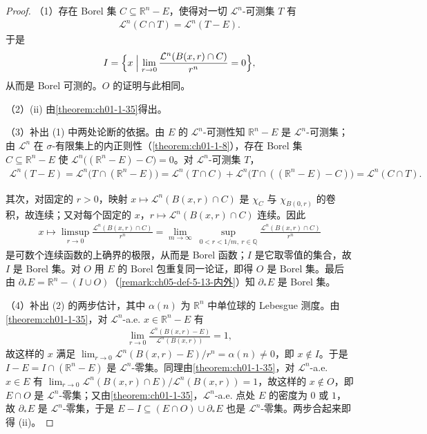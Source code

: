 \documentclass[../../main.tex]{subfiles}%
\begin{document}
\begin{proof}
（1）存在 Borel 集 $C\subseteq\mathbb{R}^n-E$，使得对一切 $\mathcal{L}^n$-可测集 $T$ 有
\begin{align*}
\mathcal{L}^n(C\cap T)=\mathcal{L}^n(T-E).
\end{align*}
于是
\begin{align*}
I=\Bigl\{x\Bigm|\lim_{r\to0}\frac{\mathcal{L}^n(B(x,r)\cap C)}{r^n}=0\Bigr\},
\end{align*}
从而是 Borel 可测的。$O$ 的证明与此相同。

（2）(ii) 由\cref{theorem:ch01-1-35}得出。%

（3）补出 (1) 中两处论断的依据。由 $E$ 的 $\mathcal{L}^n$-可测性知 $\mathbb{R}^n-E$ 是 $\mathcal{L}^n$-可测集；由 $\mathcal{L}^n$ 在 $\sigma$-有限集上的内正则性（\cref{theorem:ch01-1-8}），存在 Borel 集 $C\subseteq\mathbb{R}^n-E$ 使 $\mathcal{L}^n\bigl((\mathbb{R}^n-E)-C\bigr)=0$。对 $\mathcal{L}^n$-可测集 $T$，%
\begin{align*}
\mathcal{L}^n(T-E)=\mathcal{L}^n\bigl(T\cap(\mathbb{R}^n-E)\bigr)=\mathcal{L}^n(T\cap C)+\mathcal{L}^n\bigl(T\cap((\mathbb{R}^n-E)-C)\bigr)=\mathcal{L}^n(C\cap T).
\end{align*}

其次，对固定的 $r>0$，映射 $x\mapsto\mathcal{L}^n(B(x,r)\cap C)$ 是 $\chi_C$ 与 $\chi_{B(0,r)}$ 的卷积，故连续；又对每个固定的 $x$，$r\mapsto\mathcal{L}^n(B(x,r)\cap C)$ 连续。因此
\begin{align*}
x\mapsto\limsup_{r\to0}\frac{\mathcal{L}^n(B(x,r)\cap C)}{r^n}=\lim_{m\to\infty}\ \sup_{0<r<1/m,\ r\in\mathbb{Q}}\frac{\mathcal{L}^n(B(x,r)\cap C)}{r^n}
\end{align*}
是可数个连续函数的上确界的极限，从而是 Borel 函数；$I$ 是它取零值的集合，故 $I$ 是 Borel 集。对 $O$ 用 $E$ 的 Borel 包重复同一论证，即得 $O$ 是 Borel 集。最后由 $\partial_*E=\mathbb{R}^n-(I\cup O)$（\cref{remark:ch05-def-5-13-内外}）知 $\partial_*E$ 是 Borel 集。%

（4）补出 (2) 的两步估计，其中 $\alpha(n)$ 为 $\mathbb{R}^n$ 中单位球的 Lebesgue 测度。由\cref{theorem:ch01-1-35}，对 $\mathcal{L}^n$-a.e. $x\in\mathbb{R}^n-E$ 有%
\begin{align*}
\lim_{r\to0}\frac{\mathcal{L}^n(B(x,r)-E)}{\mathcal{L}^n(B(x,r))}=1,
\end{align*}
故这样的 $x$ 满足 $\lim_{r\to0}\mathcal{L}^n(B(x,r)-E)/r^n=\alpha(n)\neq0$，即 $x\notin I$。于是 $I-E=I\cap(\mathbb{R}^n-E)$ 是 $\mathcal{L}^n$-零集。同理由\cref{theorem:ch01-1-35}，对 $\mathcal{L}^n$-a.e. $x\in E$ 有 $\lim_{r\to0}\mathcal{L}^n(B(x,r)\cap E)/\mathcal{L}^n(B(x,r))=1$，故这样的 $x\notin O$，即 $E\cap O$ 是 $\mathcal{L}^n$-零集；又由\cref{theorem:ch01-1-35}，$\mathcal{L}^n$-a.e. 点处 $E$ 的密度为 $0$ 或 $1$，故 $\partial_*E$ 是 $\mathcal{L}^n$-零集，于是 $E-I\subseteq(E\cap O)\cup\partial_*E$ 也是 $\mathcal{L}^n$-零集。两步合起来即得 (ii)。 %
\end{proof}
\end{document}
